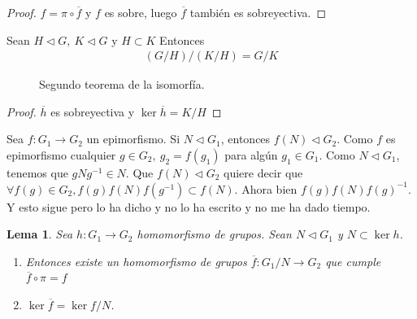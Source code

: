 \documentclass{book}
\newtheorem*{lem}{Lema}
\theoremstyle{definition}
\theoremstyle{remark}
\newcommand{\normsub}{\mathbin{\triangleleft}}
\newcommand{\inv}[1]{#1^{-1}}
\begin{document}
\begin{proof}
	$f = \pi \circ \overline{f}$ y $f$ es sobre, luego $\overline{f}$ también es sobreyectiva.
	
\end{proof}

\begin{thm}
	
	Sean $H \normsub G,\ K \normsub G$ y $H \subset K$ Entonces
	\begin{align}
		(G/H)/(K/H) = G/K
	\end{align}
\end{thm}

\begin{figure}[h]
	\centering
	\caption{Segundo teorema de la isomorfía.}
	\label{fig:tmisomorfia2}
\end{figure}

\begin{proof}
	$\overline{h}$ es sobreyectiva y $\ker \overline{h} = K/H$
\end{proof}


\begin{thm}
	Sea $f:G_1 \to G_2$ un epimorfismo. Si $N \normsub G_1$, entonces $f(N) \normsub G_2$. Como $f$ es epimorfismo cualquier $g \in G_2,\ g_2 = f(g_1)$ para algún $g_1 \in G_1$. Como $N \normsub G_1$, tenemos que $gN\inv{g} \in N$. Que $f(N) \normsub G_2$ quiere decir que $\forall f(g) \in G_2, f(g)f(N)f(\inv{g}) \subset f(N)$. Ahora bien $f(g)f(N)\inv{f(g)}$. Y esto sigue pero lo ha dicho y no lo ha escrito y no me ha dado tiempo.
\end{thm}

\begin{lem}
	Sea $h:G_1 \to G_2$ homomorfismo de grupos. Sean $N \normsub G_1$ y $N \subset \ker h$. 
	\begin{enumerate}
		\item Entonces existe un homomorfismo de grupos $\overline{f}:G_1/N \to G_2$ que cumple $\overline{f} \circ \pi = f$
		\item $\ker \overline{f} = \ker f / N$.
	\end{enumerate}
\end{lem}
\end{document}
